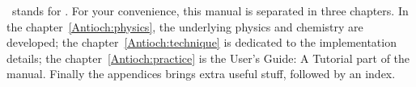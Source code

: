 \Antioch\ stands for \ANTIOCH. For your convenience,
this manual is separated in three chapters. In the
chapter~\ref{Antioch:physics}, the underlying physics
and chemistry are developed; the chapter~\ref{Antioch:technique}
is dedicated to the implementation details; the chapter~\ref{Antioch:practice}
is the \textsf{User's Guide: A Tutorial} part of the manual. Finally
the appendices brings extra useful stuff, followed by an index.
